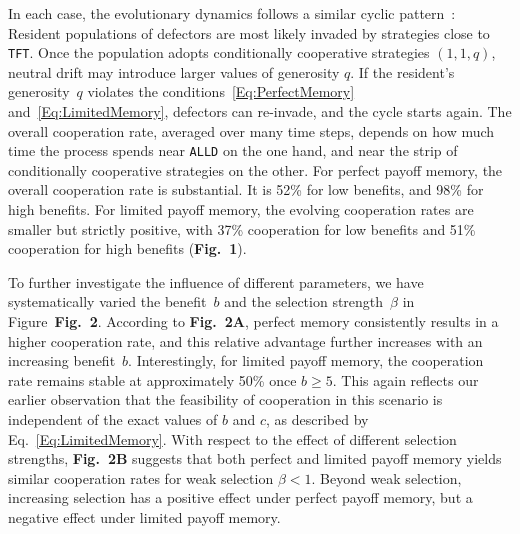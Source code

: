 \documentclass[11pt]{article}
\def\alld{\texttt{ALLD}}
\def\tft{\texttt{TFT}}
\newcommand{\FigBaseResults}{{\bf Fig.~1}}
\newcommand{\FigDependenceParameters}{{\bf Fig.~2}}
\theoremstyle{plainCl1}
\theoremstyle{plainCl2}
\begin{document}
In each case, the evolutionary dynamics follows a similar cyclic pattern~\citep[as previously described in Refs.][]{imhof2010stochastic, Nowak1992tit}:
Resident populations of defectors are most likely invaded by strategies close to \tft. 
Once the population adopts conditionally cooperative strategies  $(1,1,q)$, neutral drift may introduce larger values of generosity $q$. 
If the resident's generosity~$q$ violates the conditions~\eqref{Eq:PerfectMemory} and~\eqref{Eq:LimitedMemory}, defectors can re-invade, and the cycle starts again. 
The overall cooperation rate, averaged over many time steps, depends on how much time the process spends near \alld{} on the one hand, and near the strip of conditionally cooperative strategies on the other. 
For perfect payoff memory, the overall cooperation rate is substantial. 
It is 52\% for low benefits, and 98\% for high benefits. 
For limited payoff memory, the evolving cooperation rates are smaller but strictly positive, with 37\% cooperation for low benefits and 51\% cooperation for high benefits (\FigBaseResults). 


To further investigate the influence of different parameters, we have systematically varied the benefit~$b$ and the selection strength~$\beta$ in Figure~\FigDependenceParameters.
According to \FigDependenceParameters \textbf{A}, perfect memory consistently results in a higher cooperation rate, and this relative advantage further increases with an increasing benefit~$b$. 
Interestingly, for limited payoff memory, the cooperation rate remains stable at approximately 50\% once \(b \!\ge\! 5\).
This again reflects our earlier observation that the feasibility of cooperation in this scenario is independent of the exact values of $b$ and $c$, as described by Eq.~\eqref{Eq:LimitedMemory}. 
With respect to the effect of different selection strengths, \FigDependenceParameters\textbf{B} suggests that both perfect and limited payoff memory yields similar cooperation rates for weak selection \(\beta \!<\! 1\). 
Beyond weak selection, increasing selection has a positive effect under perfect payoff memory, but a negative effect under limited payoff memory.\\


\end{document}
